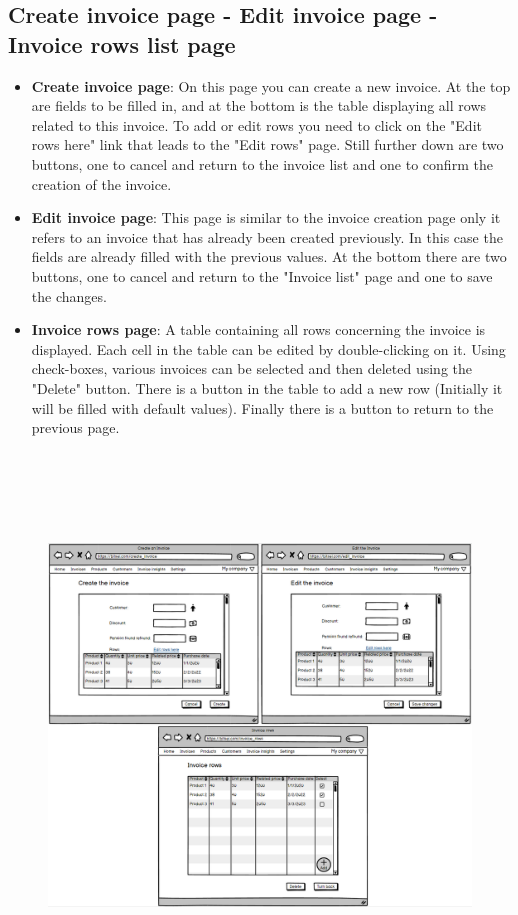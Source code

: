 \subsection{Create invoice page - Edit invoice page - Invoice rows list page}

\begin{itemize}
    \item \textbf{Create invoice page}: On this page you can create a new invoice. At the top are fields to be filled in, and at the bottom is the table displaying all rows related to this invoice. To add or edit rows you need to click on the "Edit rows here" link that leads to the "Edit rows" page. Still further down are two buttons, one to cancel and return to the invoice list and one to confirm the creation of the invoice.
    \item \textbf{Edit invoice page}: This page is similar to the invoice creation page only it refers to an invoice that has already been created previously. In this case the fields are already filled with the previous values. At the bottom there are two buttons, one to cancel and return to the "Invoice list" page and one to save the changes.
    \item \textbf{Invoice rows page}: A table containing all rows concerning the invoice is displayed. Each cell in the table can be edited by double-clicking on it. Using check-boxes, various invoices can be selected and then deleted using the "Delete" button. There is a button in the table to add a new row (Initially it will be filled with default values). Finally there is a button to return to the previous page.
\end{itemize}

\begin{figure}[h!]
    \centering
    \includegraphics[height=410pt, keepaspectratio]{resources/mockup/Invoice.png}
\end{figure}
\newpage

